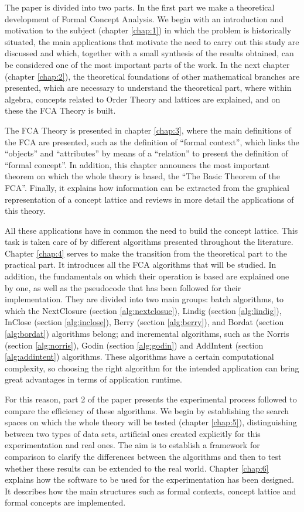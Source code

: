 \documentclass[oneside,openright,titlepage,numbers=noenddot,openany,headinclude,footinclude=true,
cleardoublepage=empty,abstractoff,BCOR=5mm,paper=a4,fontsize=12pt,main=spanish]{scrreprt}
\begin{document}
The paper is divided into two parts. In the first part we make a theoretical development of Formal Concept Analysis. We begin with an introduction and motivation to the subject (chapter \ref{chap:1}) in which the problem is historically situated, the main applications that motivate the need to carry out this study are discussed and which, together with a small synthesis of the results obtained, can be considered one of the most important parts of the work. In the next chapter (chapter \ref{chap:2}), the theoretical foundations of other mathematical branches are presented, which are necessary to understand the theoretical part, where within algebra, concepts related to Order Theory and lattices are explained,  and on these the FCA Theory is built. 

The FCA Theory is presented in chapter \ref{chap:3}, where the main definitions of the FCA are presented, such as the definition of ``formal context'', which links the ``objects'' and ``attributes'' by means of a ``relation'' to present the definition of ``formal concept''. In addition, this chapter announces the most important theorem on which the whole theory is based, the ``The Basic Theorem of the FCA''. Finally, it explains how information can be extracted from the graphical representation of a concept lattice and reviews in more detail the applications of this theory.

All these applications have in common the need to build the concept lattice. This task is taken care of by different algorithms presented throughout the literature.  Chapter \ref{chap:4} serves to make the transition from the theoretical part to the practical part. It introduces all the FCA algorithms that will be studied. In addition, the fundamentals on which their operation is based are explained one by one, as well as the pseudocode that has been followed for their implementation. They are divided into two main groups: batch algorithms, to which the NextClosure (section \ref{alg:nextclosue}),  Lindig (section \ref{alg:lindig}), InClose (section \ref{alg:inclose}), Berry (section \ref{alg:berry}), and Bordat (section \ref{alg:bordat}) algorithms belong; and incremental algorithms, such as the Norris (section \ref{alg:norris}), Godin (section \ref{alg:godin}) and AddIntent (section \ref{alg:addintent}) algorithms. These algorithms have a certain computational complexity, so choosing the right algorithm for the intended application can bring great advantages in terms of application runtime.

For this reason, part 2 of the paper presents the experimental process followed to compare the efficiency of these algorithms. We begin by establishing the search spaces on which the whole theory will be tested (chapter \ref{chap:5}), distinguishing between two types of data sets, artificial ones created explicitly for this experimentation and real ones. The aim is to establish a framework for comparison to clarify the differences between the algorithms and then to test whether these results can be extended to the real world. Chapter \ref{chap:6} explains how the software to be used for the experimentation has been designed. It describes how the main structures such as formal contexts, concept lattice and formal concepts are implemented. 
\end{document}
